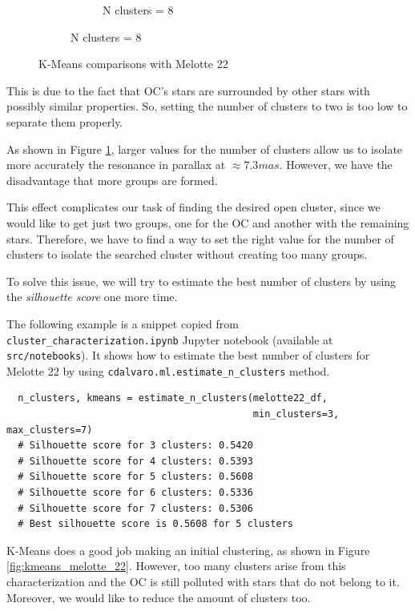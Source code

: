 \documentclass[11pt, a4paper, english]{book}
\begin{document}
\begin{figure}[htbp]
\begin{subfigure}{0.9\textwidth}
\begin{subfigure}[t]{0.3\textwidth}
      \caption{N clusters = 8}
    \end{subfigure}
  \end{subfigure}
  \caption{K-Means comparisons with Melotte 22}
  \label{fig:kmeans_comparisons_melotte_22}
\end{figure}

This is due to the fact that OC's stars are surrounded by other stars with possibly similar properties.
So, setting the number of clusters to two is too low to separate them properly.

As shown in Figure \ref{fig:kmeans_comparisons_melotte_22},
larger values for the number of clusters allow us to isolate more accurately the resonance in parallax at $\approx 7.3mas$.
However, we have the disadvantage that more groups are formed.

This effect complicates our task of finding the desired open cluster,
since we would like to get just two groups, one for the OC and another with the remaining stars.
Therefore, we have to find a way to set the right value for the number of clusters
to isolate the searched cluster without creating too many groups.

To solve this issue, we will try to estimate the best number of clusters by using the \emph{silhouette score} one more time.

The following example is a snippet copied from \verb|cluster_characterization.ipynb|
Jupyter notebook (available at \verb|src/notebooks|).
It shows how to estimate the best number of clusters for Melotte 22 by using \verb|cdalvaro.ml.estimate_n_clusters| method.

\begin{verbatim}
  n_clusters, kmeans = estimate_n_clusters(melotte22_df,
                                           min_clusters=3, max_clusters=7)
  # Silhouette score for 3 clusters: 0.5420
  # Silhouette score for 4 clusters: 0.5393
  # Silhouette score for 5 clusters: 0.5608
  # Silhouette score for 6 clusters: 0.5336
  # Silhouette score for 7 clusters: 0.5306
  # Best silhouette score is 0.5608 for 5 clusters
\end{verbatim}

K-Means does a good job making an initial clustering,
as shown in Figure \ref{fig:kmeans_melotte_22}.
However, too many clusters arise from this characterization
and the OC is still polluted with stars that do not belong to it.
Moreover, we would like to reduce the amount of clusters too.
\end{document}
